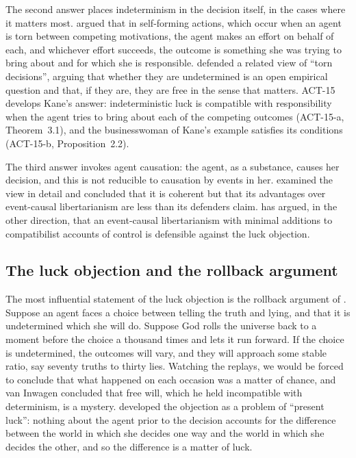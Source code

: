 \documentclass{situationist-preprint}
\begin{document}
The second answer places indeterminism in the decision itself, in the cases where it matters most. \citet{Kane1996} argued that in self-forming actions, which occur when an agent is torn between competing motivations, the agent makes an effort on behalf of each, and whichever effort succeeds, the outcome is something she was trying to bring about and for which she is responsible. \citet{Balaguer2010} defended a related view of \enquote{torn decisions}, arguing that whether they are undetermined is an open empirical question and that, if they are, they are free in the sense that matters. ACT-15 develops Kane's answer: indeterministic luck is compatible with responsibility when the agent tries to bring about each of the competing outcomes (ACT-15-a, Theorem~3.1), and the businesswoman of Kane's example satisfies its conditions (ACT-15-b, Proposition~2.2).

The third answer invokes agent causation: the agent, as a substance, causes her decision, and this is not reducible to causation by events in her. \citet{Clarke2003} examined the view in detail and concluded that it is coherent but that its advantages over event-causal libertarianism are less than its defenders claim. \citet{Franklin2018} has argued, in the other direction, that an event-causal libertarianism with minimal additions to compatibilist accounts of control is defensible against the luck objection.

\subsection{The luck objection and the rollback argument}

The most influential statement of the luck objection is the rollback argument of \citet{vanInwagen2000}. Suppose an agent faces a choice between telling the truth and lying, and that it is undetermined which she will do. Suppose God rolls the universe back to a moment before the choice a thousand times and lets it run forward. If the choice is undetermined, the outcomes will vary, and they will approach some stable ratio, say seventy truths to thirty lies. Watching the replays, we would be forced to conclude that what happened on each occasion was a matter of chance, and van Inwagen concluded that free will, which he held incompatible with determinism, is a mystery. \citet{Mele2006} developed the objection as a problem of \enquote{present luck}: nothing about the agent prior to the decision accounts for the difference between the world in which she decides one way and the world in which she decides the other, and so the difference is a matter of luck.
\end{document}
